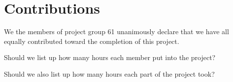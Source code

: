 \documentclass[a4paper,12pt]{article}
\begin{document}
\section{Contributions}
\label{sec:contributions}
We the members of project group 61 unanimously declare that
we have all equally contributed toward the completion of this
project.

Should we list up how many hours each member put into the project?

Should we also list up how many hours each part of the project took?



\clearpage


\end{document}
